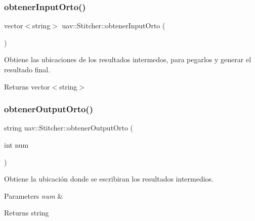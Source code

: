 \subsubsection{\texorpdfstring{obtener\+Input\+Orto()}{obtenerInputOrto()}}
{\footnotesize\ttfamily vector$<$string$>$ uav\+::\+Stitcher\+::obtener\+Input\+Orto (\begin{DoxyParamCaption}{ }\end{DoxyParamCaption})\hspace{0.3cm}{\ttfamily [inline]}}



Obtiene las ubicaciones de los resultados intermedos, para pegarlos y generar el resultado final. 

\begin{DoxyReturn}{Returns}
vector$<$string$>$ 
\end{DoxyReturn}
\mbox{\label{classuav_1_1Stitcher_a2f5433b17c42c874359f7f92148b4ee2}} 
\subsubsection{\texorpdfstring{obtener\+Output\+Orto()}{obtenerOutputOrto()}}
{\footnotesize\ttfamily string uav\+::\+Stitcher\+::obtener\+Output\+Orto (\begin{DoxyParamCaption}\item[{int}]{num }\end{DoxyParamCaption})\hspace{0.3cm}{\ttfamily [inline]}}



Obtiene la ubicación donde se escribiran los resultados intermedios. 


\begin{DoxyParams}{Parameters}
{\em num} & \\
\hline
\end{DoxyParams}
\begin{DoxyReturn}{Returns}
string 
\end{DoxyReturn}
\mbox{\label{classuav_1_1Stitcher_a5f6f8f09c80f39daf9f2ea34e0db91b9}} 
